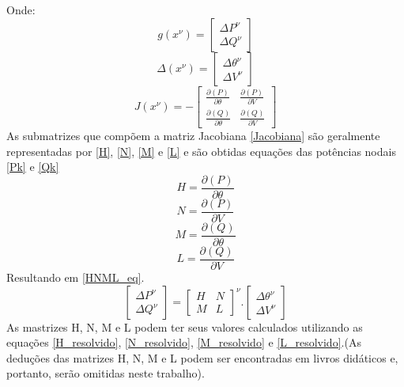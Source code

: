 Onde:\\
\begin{equation}
   g(x^\nu) = \left[ \begin{matrix} \Delta P^\nu \\ \Delta Q^\nu  \end{matrix} \right] 
    \label{g_x_nu}
\end{equation}
\begin{equation}
   \Delta (x^\nu) = \left[ \begin{matrix} \Delta \theta^\nu \\ \Delta V^\nu  \end{matrix} \right] 
    \label{delta_x_nu}
\end{equation}
\begin{equation}
   J (x^\nu) = - \left[ \begin{matrix} \frac{\partial (P)}{\partial \theta} & \frac{\partial (P)}{\partial V}  \\ \frac{\partial (Q)}{\partial \theta} & \frac{\partial (Q)}{\partial V}  \end{matrix} \right] 
    \label{Jacobiana}
\end{equation}
As submatrizes que compõem a matriz Jacobiana \ref{Jacobiana} são geralmente representadas por \ref{H}, \ref{N}, \ref{M} e \ref{L} e são obtidas equações das potências nodais \ref{Pk} e \ref{Qk}
\begin{equation}
   H = \frac{\partial (P)}{\partial \theta}
    \label{H}
\end{equation}
\begin{equation}
   N = \frac{\partial (P)}{\partial V}
    \label{N}
\end{equation}
\begin{equation}
   M = \frac{\partial (Q)}{\partial \theta}
    \label{M}
\end{equation}
\begin{equation}
   L = \frac{\partial (Q)}{\partial V}
    \label{L}
\end{equation}
Resultando em \ref{HNML_eq}.
\begin{equation}
    \left[ \begin{matrix} \Delta P^\nu \\ \Delta Q^\nu  \end{matrix} \right]  = \left[ \begin{matrix} H & N \\ M & L  \end{matrix} \right]^\nu . \left[ \begin{matrix} \Delta \theta^\nu \\ \Delta V^\nu  \end{matrix} \right] 
    \label{HNML_eq}
\end{equation}
As mastrizes H, N, M e L podem ter seus valores calculados utilizando as equações \ref{H_resolvido}, \ref{N_resolvido}, \ref{M_resolvido} e \ref{L_resolvido}.(As deduções das matrizes H, N, M e L podem ser encontradas em livros didáticos e, portanto, serão omitidas neste trabalho).\\

